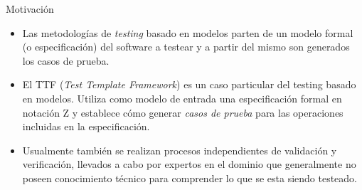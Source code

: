 \documentclass{beamer}
\begin{document}
\begin{frame}{Motivación}{}
  \begin{itemize}
                          
    \item Las metodologías de \emph{testing} basado en modelos parten de un modelo formal (o especificación) del software a testear y a partir del mismo son generados los casos de prueba. 
                                      
                                      
    \item  El TTF (\emph{Test Template Framework}) es un caso particular del testing basado en modelos. Utiliza como modelo de entrada una especificación formal en notación Z y establece cómo generar \emph{casos de prueba} para las operaciones incluidas en la especificación.

                                                  
                                                  
    \item Usualmente también se realizan procesos independientes de validación y verificación, llevados a cabo por expertos en el dominio que generalmente no poseen conocimiento técnico para comprender lo que se esta siendo testeado.
                                                              
                                                              
  \end{itemize}
\end{frame}
                                      
\end{document}
